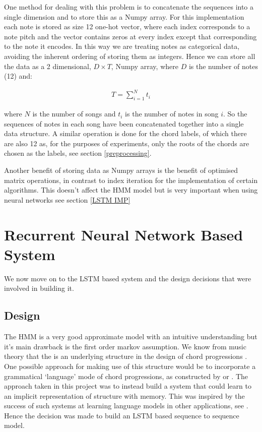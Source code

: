 \documentclass[bsc,singlespacing,logo, parskip, deptreport]{infthesis}
\begin{document}
One method for dealing with this problem is to concatenate the sequences into a single dimension and to store this as a Numpy array. For this implementation each note is stored as size 12 one-hot vector, where each index corresponds to a note pitch and the vector contains zeros at every index except that corresponding to the note it encodes. In this way we are treating notes as categorical data, avoiding the inherent ordering of storing them as integers. Hence we can store all the data as a 2 dimensional, $D \times T$, Numpy array, where $D$ is the number of notes (12) and:

\begin{align}
  T = \sum_{i=1}^{N} t_i
\end{align}

where $N$ is the number of songs and $t_i$ is the number of notes in song $i$. So the sequences of notes in each song have been concatenated together into a single data structure. A similar operation is done for the chord labels, of which there are also 12 as, for the purposes of experiments, only the roots of the chords are chosen as the labels, see section \ref{preprocessing}.

Another benefit of storing data as Numpy arrays is the benefit of optimised matrix operations, in contrast to index iteration for the implementation of certain algorithms. This doesn't affect the HMM model but is very important when using neural networks see section \ref{LSTM IMP}

\section{Recurrent Neural Network Based System}
We now move on to the LSTM based system and the design decisions that were involved in building it. 

\subsection{Design}
The HMM is a very good approximate model with an intuitive understanding but it's main drawback is the first order markov assumption. We know from music theory that the is an underlying structure in the design of chord progressions \cite{krumhansl1982perceived} \cite{piston1948harmony}. One possible approach for making use of this structure would be to incorporate a grammatical `language' mode of chord progressions, as constructed by \cite{granroth2014robust} or \cite{rohrmeier2007generative}. The approach taken in this project was to instead build a system that could learn to an implicit representation of structure with memory. This was inspired by the success of such systems at learning language models in other applications, see \cite{schmidhuber2002learning} \cite{sundermeyer2012lstm}. Hence the decision was made to build an LSTM based sequence to sequence model.
\end{document}
